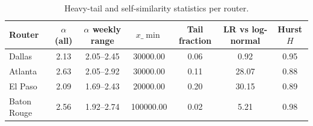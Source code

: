 \begin{table}[t]
\caption{Heavy-tail and self-similarity statistics per router.}
\label{tab:distribution}
\centering
\begin{tabular}{lcccccc}
\hline
\textbf{Router} & \textbf{$\alpha$ (all)} & \textbf{$\alpha$ weekly range} & \textbf{$x\_{\min}$} & \textbf{Tail fraction} & \textbf{LR vs log-normal} & \textbf{Hurst $H$} \\
\hline
Dallas & 2.13 & 2.05--2.45 & 30000.00 & 0.06 & 0.92 & 0.95 \\
Atlanta & 2.63 & 2.05--2.92 & 30000.00 & 0.11 & 28.07 & 0.88 \\
El Paso & 2.09 & 1.69--2.43 & 20000.00 & 0.20 & 30.15 & 0.89 \\
Baton Rouge & 2.56 & 1.92--2.74 & 100000.00 & 0.02 & 5.21 & 0.98 \\
\hline
\end{tabular}
\end{table}
